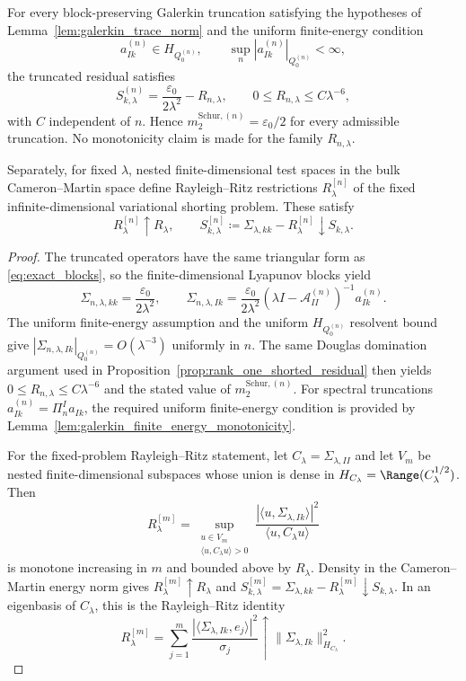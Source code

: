 \begin{lemma}
\label{lem:galerkin_variational_shorting}
For every block-preserving Galerkin truncation satisfying the hypotheses of
Lemma~\ref{lem:galerkin_trace_norm} and the uniform finite-energy condition
\[
  a_{Ik}^{(n)}\in H_{Q_0^{(n)}},
  \qquad
  \sup_n |a_{Ik}^{(n)}|_{Q_0^{(n)}}<\infty,
\]
the truncated residual satisfies
\[
  S_{k,\lambda}^{(n)}
  =
  \frac{\varepsilon_0}{2\lambda^2}-R_{n,\lambda},
  \qquad
  0\le R_{n,\lambda}\le C\lambda^{-6},
\]
with $C$ independent of $n$.  Hence
$m_2^{\mathrm{Schur},(n)}=\varepsilon_0/2$ for every admissible truncation.
No monotonicity claim is made for the family $R_{n,\lambda}$.

Separately, for fixed $\lambda$, nested finite-dimensional test spaces in the
bulk Cameron--Martin space define Rayleigh--Ritz restrictions
$R_\lambda^{[n]}$ of the fixed infinite-dimensional variational shorting
problem.  These satisfy
\[
  R_\lambda^{[n]}\uparrow R_\lambda,
  \qquad
  S_{k,\lambda}^{[n]}\coloneqq\Sigma_{\lambda,kk}-R_\lambda^{[n]}
  \downarrow S_{k,\lambda}.
\]
\end{lemma}

\begin{proof}
The truncated operators have the same triangular form as
\eqref{eq:exact_blocks}, so the finite-dimensional Lyapunov blocks yield
\[
  \Sigma_{n,\lambda,kk}=\frac{\varepsilon_0}{2\lambda^2},
  \qquad
  \Sigma_{n,\lambda,Ik}
  =
  \frac{\varepsilon_0}{2\lambda^2}
  (\lambda I-\mathcal{A}_{II}^{(n)})^{-1}a_{Ik}^{(n)}.
\]
The uniform finite-energy assumption and the uniform $H_{Q_0^{(n)}}$ resolvent
bound give
$|\Sigma_{n,\lambda,Ik}|_{Q_0^{(n)}}=O(\lambda^{-3})$ uniformly in $n$.
The same Douglas domination argument used in
Proposition~\ref{prop:rank_one_shorted_residual} then yields
$0\le R_{n,\lambda}\le C\lambda^{-6}$ and the stated value of
$m_2^{\mathrm{Schur},(n)}$.  For spectral truncations
$a_{Ik}^{(n)}=\Pi_n^I a_{Ik}$, the required uniform finite-energy condition is
provided by Lemma~\ref{lem:galerkin_finite_energy_monotonicity}.

For the fixed-problem Rayleigh--Ritz statement, let
$C_\lambda=\Sigma_{\lambda,II}$ and let $V_m$ be nested finite-dimensional
subspaces whose union is dense in $H_{C_\lambda}=\Range(C_\lambda^{1/2})$.
Then
\[
  R_\lambda^{[m]}
  =
  \sup_{\substack{u\in V_m\\ \langle u,C_\lambda u\rangle>0}}
  \frac{|\langle u,\Sigma_{\lambda,Ik}\rangle|^2}
       {\langle u,C_\lambda u\rangle}
\]
is monotone increasing in $m$ and bounded above by $R_\lambda$.  Density in the
Cameron--Martin energy norm gives $R_\lambda^{[m]}\uparrow R_\lambda$ and
$S_{k,\lambda}^{[m]}=\Sigma_{\lambda,kk}-R_\lambda^{[m]}\downarrow
S_{k,\lambda}$.  In an eigenbasis of $C_\lambda$, this is the Rayleigh--Ritz
identity
\[
  R_\lambda^{[m]}
  =
  \sum_{j=1}^m
  \frac{|\langle\Sigma_{\lambda,Ik},e_j\rangle|^2}{\sigma_j}
  \uparrow
  \|\Sigma_{\lambda,Ik}\|_{H_{C_\lambda}}^2.
\]
\end{proof}


